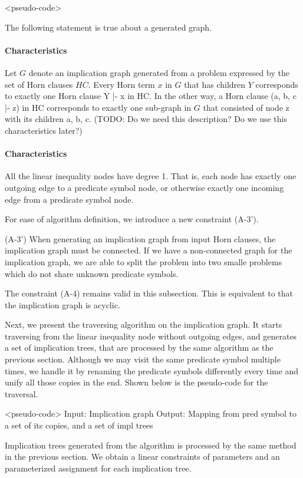 \documentclass{llncs}
\begin{document}
<pseudo-code>

The following statement is true about a generated graph.

\paragraph{Characteristics} Let $G$ denote an implication graph generated from a problem expressed by the set of Horn clauses $HC$. Every Horn term $x$ in $G$ that has children $Y$ corresponds to exactly one Horn clause Y |- x in HC. In the other way, a Horn clause (a, b, c |- z) in HC corresponds to exactly one sub-graph in $G$ that consisted of node z with its children a, b, c. (TODO: Do we need this description? Do we use this characteristics later?)

\paragraph{Characteristics} All the linear inequality nodes have degree 1. That is, each node has exactly one outgoing edge to a predicate symbol node, or otherwise exactly one incoming edge from a predicate symbol node.

For ease of algorithm definition, we introduce a new constraint (A-3').

(A-3') When generating an implication graph from input Horn clauses, the implication graph must be connected. If we have a non-connected graph for the implication graph, we are able to split the problem into two smalle problems which do not share unknown predicate symbols.

The constraint (A-4) remains valid in this subsection. This is equivalent to that the implication graph is acyclic.

Next, we present the traversing algorithm on the implication graph. It starts traversing from the linear inequality node without outgoing edges, and generates a set of implication trees, that are processed by the same algorithm as the previous section. Although we may visit the same predicate symbol multiple times, we handle it by renaming the predicate symbols differently every time and unify all those copies in the end. Shown below is the pseudo-code for the traversal.

<pseudo-code>
Input: Implication graph
Output: Mapping from pred symbol to a set of its copies, and a set of impl trees

Implication trees generated from the algorithm is processed by the same method in the previous section. We obtain a linear constraints of parameters and an parameterized assignment for each implication tree.
\end{document}
